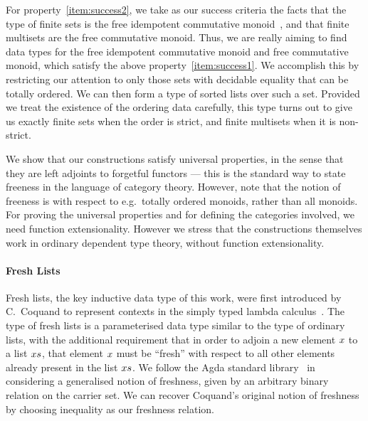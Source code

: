\documentclass[a4paper]{easychair}
\newcommand{\AgdaBoundFontStyle}[1]{\textit{#1}}
\newcommand{\AgdaFormat}[2]{#2}
\newcommand{\AgdaNoSpaceMath}[1]
    {\begingroup\thickmuskip=0mu\medmuskip=0mu#1\endgroup}
\newcommand{\AgdaBound}[1]
    {\AgdaNoSpaceMath{\textcolor{AgdaBound}{\AgdaBoundFontStyle{\AgdaFormat{#1}{#1}}}}}
\newcommand\bv[1]{{\AgdaBound{$#1$}}}
\begin{document}
For property~\eqref{item:success2}, we take as our success criteria the facts that
the type of finite sets is the free idempotent commutative monoid~\cite{frumin2018finsetshott},
and that finite multisets are the free commutative monoid.
Thus, we are really aiming to find data types for the free idempotent commutative monoid and free commutative monoid, which satisfy the above property~\eqref{item:success1}.
We accomplish this by restricting our attention to only those sets with decidable equality that can be totally ordered.
We can then form a type of sorted lists over such a set.
Provided we treat the existence of the ordering data carefully, this type turns out to give us exactly finite sets when the order is strict, and finite multisets when it is non-strict.


We show that our constructions satisfy universal properties, in the sense that they are left adjoints to forgetful functors --- this is the standard way to state freeness in the language of category theory.
However, note that the notion of freeness is with respect to e.g.\ totally ordered monoids, rather than all monoids.
%
For proving the universal properties and for defining the categories involved, we need function extensionality.
However we stress that the constructions themselves work in ordinary dependent type theory, without function extensionality.

\paragraph{Fresh Lists}
Fresh lists, the key inductive data type of this work, were first introduced by C.~Coquand to represent contexts in the simply typed lambda calculus~\cite{ccoquand2002formalstlc}.
The type of fresh lists is a parameterised data type similar to the type of ordinary lists,
with the additional requirement that in order to adjoin
a new element $\bv{x}$ to a list $\bv{xs}$, that element $\bv{x}$ must be ``fresh'' with respect to all other elements already present in the list $\bv{xs}$.
We follow the Agda standard library~\cite{agda-stdlib} in considering a generalised notion of freshness, given by an arbitrary binary relation on the carrier set.
We can recover Coquand's original notion of freshness by choosing inequality as our freshness relation.
\end{document}
